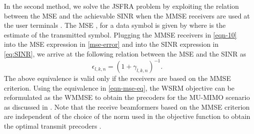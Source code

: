 In the second method, we solve the \ac{JSFRA} problem by exploiting the relation between the \ac{MSE} and the achievable \ac{SINR} when the \ac{MMSE} receivers are used at the user terminals \cite{mse_duality,christensen2008weighted}. The \ac{MSE} , for a data symbol  is given by
\iftoggle{single_column}{
\begin{equation} \label{mse-error}
	\mathbb{E} \big [ ( d_{l,k,n} - \hat{d}_{l,k,n} )^2 \big ] = \left | 1 - \mvec{w}{l,k,n}^\herm \mvec{H}{b_k,k,n} \mvec{m}{l,k,n} \right |^2 + \sum_{\mathclap{(j,i) \neq (l,k)}} \left | \mvec{w}{l,k,n}^\herm \mvec{H}{b_i,k,n} \mvec{m}{j,i,n} \right |^2 + \enoise = \epsilon_{l,k,n}
\end{equation}}{\allowdisplaybreaks
\begin{multline} \label{mse-error}
 \mathbb{E} \big [ ( d_{l,k,n} - \hat{d}_{l,k,n} )^2 \big ] = \left | 1 - \mvec{w}{l,k,n}^\herm \mvec{H}{b_k,k,n} \mvec{m}{l,k,n} \right |^2 \\
 + \sum_{\mathclap{(j,i) \neq (l,k)}} \left | \mvec{w}{l,k,n}^\herm \mvec{H}{b_i,k,n} \mvec{m}{j,i,n} \right |^2 + \enoise = \epsilon_{l,k,n}
\end{multline}}
where  is the estimate of the transmitted symbol. Plugging the \ac{MMSE} receivers in \eqref{eqn-10} into the \ac{MSE} expression in \eqref{mse-error} and into the \ac{SINR} expression in \eqref{eq:SINR}, we arrive at the following relation between the \ac{MSE} and the \ac{SINR} as
\begin{equation} \label{eqn-mse-eq}
\epsilon_{l,k,n} = (1 + \gamma_{l,k,n})^{-1}.
\end{equation}
The above equivalence is valid only if the receivers are based on the \ac{MMSE} criterion. Using the equivalence in \eqref{eqn-mse-eq}, the \ac{WSRM} objective can be reformulated as the \ac{WMMSE} to obtain the precoders for the \acs{MU}-\acs{MIMO} scenario as discussed in \cite{christensen2008weighted,wmmse_shi,hong2012decomposition}. Note that the receive beamformers based on the \ac{MMSE} criterion are independent of the choice of the  norm used in the objective function to obtain the optimal transmit precoders .

